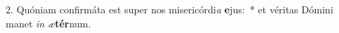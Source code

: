 2. Quóniam confirmáta est super nos misericórdi\textit{a} \textbf{e}jus:~*  et véritas Dómini manet \textit{in} \textit{æ}\textbf{tér}num.\

